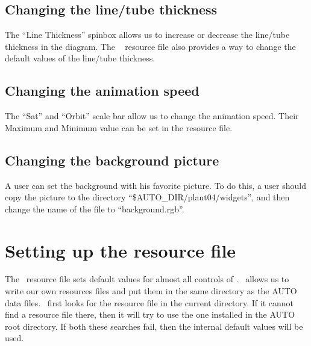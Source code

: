 \subsection{Changing the line/tube thickness}

The ``Line Thickness'' spinbox allows us to increase or decrease the line/tube thickness
in the diagram.  The \PLAUT~ resource file also provides a way to change the default values of the
line/tube thickness.

\subsection{Changing the animation speed}

The ``Sat'' and ``Orbit'' scale bar allow us to change the animation speed. 
Their Maximum and Minimum value can be set in the resource file.

\subsection{Changing the background picture}

A user can set the background with his favorite picture. 
To do this, a user should copy the picture to the directory ``\$AUTO\_DIR/plaut04/widgets'', 
and then change the name of the file to ``background.rgb''.

\section{Setting up the resource file}

The \PLAUT~resource file sets default values for 
almost all controls of \PLAUT. 
\PLAUT~allows us to write our own resources files and put them in the same directory as the AUTO data files. 
\PLAUT~first looks for the resource file in the current directory.
If it cannot find a resource file there, then it will try to use the one installed
in the AUTO root directory. If both these searches fail, then the internal
default values will be used.

